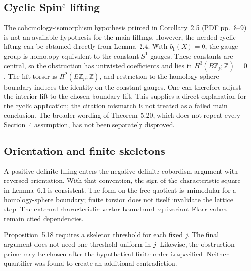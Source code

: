 \documentclass[10pt]{article}
\begin{document}
\subsection*{Cyclic Spin\(^c\) lifting}
The cohomology-isomorphism hypothesis printed in Corollary 2.5 (PDF pp. 8–9) is not an available hypothesis for the main fillings. However, the needed cyclic lifting can be obtained directly from Lemma 2.4. With \(b_1(X)=0\), the gauge group is homotopy equivalent to the constant \(S^1\) gauges. These constants are central, so the obstruction has untwisted coefficients and lies in \(H^3(B\mathbb Z_p;\mathbb Z)=0\). The lift torsor is \(H^2(B\mathbb Z_p;\mathbb Z)\), and restriction to the homology-sphere boundary induces the identity on the constant gauges. One can therefore adjust the interior lift to the chosen boundary lift. This supplies a direct explanation for the cyclic application; the citation mismatch is not treated as a failed main conclusion. The broader wording of Theorem 5.20, which does not repeat every Section 4 assumption, has not been separately disproved.\par
\subsection*{Orientation and finite skeletons}
A positive-definite filling enters the negative-definite cobordism argument with reversed orientation. With that convention, the sign of the characteristic square in Lemma 6.1 is consistent. The form on the free quotient is unimodular for a homology-sphere boundary; finite torsion does not itself invalidate the lattice step. The external characteristic-vector bound and equivariant Floer values remain cited dependencies.\par
Proposition 5.18 requires a skeleton threshold for each fixed \(j\). The final argument does not need one threshold uniform in \(j\). Likewise, the obstruction prime may be chosen after the hypothetical finite order is specified. Neither quantifier was found to create an additional contradiction.\par
\end{document}
